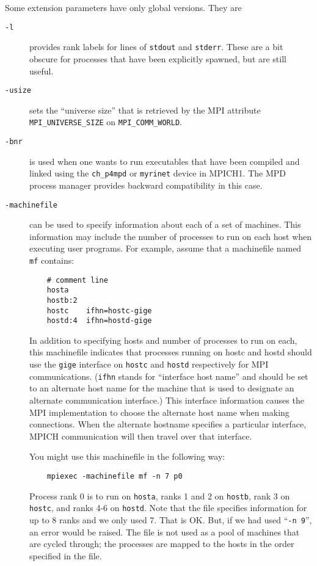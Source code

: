 \documentclass[dvipdfm,11pt]{article}
\begin{document}
Some extension parameters have only global versions.  They are
\begin{description}
\item[\texttt{-l}] provides rank labels for lines of \texttt{stdout} and
  \texttt{stderr}.  These are a bit obscure for processes that have
  been explicitly spawned, but are still useful.
\item[\texttt{-usize}] sets the ``universe size'' that is retrieved by the MPI
  attribute \\
\texttt{MPI\_UNIVERSE\_SIZE} on \texttt{MPI\_COMM\_WORLD}. 
\item[\texttt{-bnr}] is used when one wants to run executables that have
  been compiled and linked using the \texttt{ch\_p4mpd} or
  \texttt{myrinet} device in MPICH1.  The MPD process manager provides
  backward compatibility in this case.
\item[\texttt{-machinefile}] can be used to specify information
about each of a set of machines.  This information may include the
number of processes to run on each host when executing user programs.
For example, assume that a machinefile named \texttt{mf} contains:
\begin{verbatim}
    # comment line
    hosta
    hostb:2
    hostc    ifhn=hostc-gige
    hostd:4  ifhn=hostd-gige
\end{verbatim}
In addition to specifying hosts and number of processes to run on each,
this machinefile indicates that processes running on hostc and hostd
should use the \texttt{gige} interface on \texttt{hostc} and
\texttt{hostd}
respectively for MPI communications.  (\texttt{ifhn} stands for
``interface host name'' and should be set to an alternate host name for
the machine that is used to designate an alternate communication interface.)
This interface information causes the MPI implementation to choose the
alternate host name when making connections.  When the alternate
hostname specifies a particular interface, MPICH communication will then
travel over that interface.

You might use this machinefile in the following way:
\begin{verbatim}
    mpiexec -machinefile mf -n 7 p0
\end{verbatim}
Process rank 0 is to run on \texttt{hosta}, ranks 1 and 2 on
\texttt{hostb}, rank 3 on \texttt{hostc}, and ranks 4-6 on
\texttt{hostd}.  Note that the file specifies information for up to 8
ranks and we only used 7.  That is OK.  But, if we had used ``\texttt{-n
  9}'', an error would be raised.  The file is not used as a pool of
machines that are cycled through; the processes are mapped to the hosts
in the order specified in the file.


\end{description}
\end{document}
